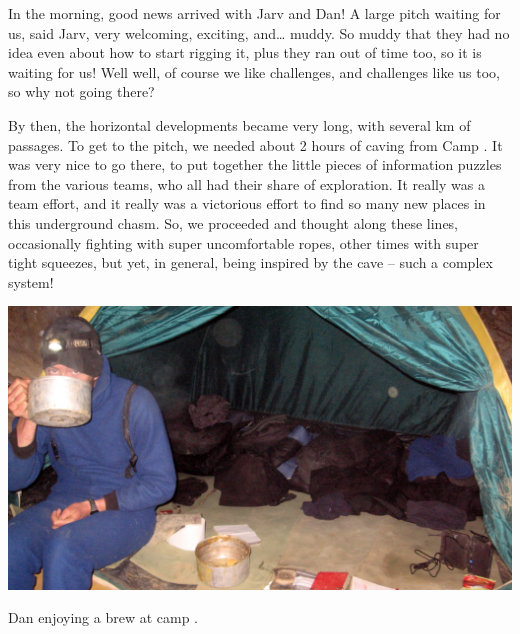 In the morning, good news arrived with Jarv and Dan! A large pitch
waiting for us, said Jarv, very welcoming, exciting, and\ldots{} muddy.
So muddy that they had no idea even about how to start rigging it, plus
they ran out of time too, so it is waiting for us! Well well, of course
we like challenges, and challenges like us too, so why not going there?


By then, the horizontal developments became very long, with several km
of passages. To get to the pitch, we needed about 2 hours of caving from
Camp . It was very nice to go there, to put together the
little pieces of information puzzles from the various teams, who all had
their share of exploration. It really was a team effort, and it really
was a victorious effort to find so many new places in this underground
chasm. So, we proceeded and thought along these lines, occasionally
fighting with super uncomfortable ropes, other times with super tight
squeezes, but yet, in general, being inspired by the cave -- such a
complex system!


\begin{pagefigure}
\checkoddpage \ifoddpage \forcerectofloat \else \forceversofloat \fi
   \centering
\includegraphics[width = \textwidth]{2011/stuck_in_paradise/2011-08-01-13.24.09-Jarvist M Frost-CanonA520-IMG_0173 - Dan Drinking Tea in the Tent at Camp X-Ray--orig.jpg}
\caption{Dan enjoying a brew at camp . } \label{dan brew}
\end{pagefigure}


